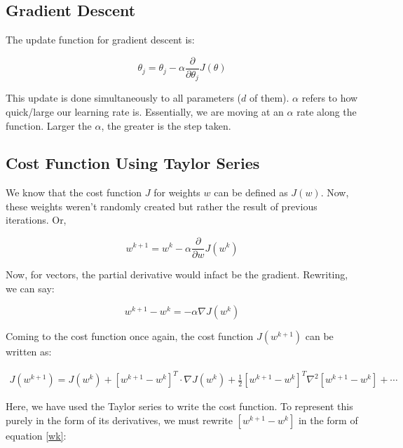 \subsection{Gradient Descent}

The update function for gradient descent is:

\begin{equation}
    \theta_j = \theta_j - \alpha \frac{\partial}{\partial\theta_j} J(\theta)
\end{equation}

This update is done simultaneously to all parameters ($d$ of them). $\alpha$ refers to how quick/large our learning rate is. Essentially, we are moving at an $\alpha$ rate along the function. Larger the $\alpha$, the greater is the step taken.

\subsection{Cost Function Using Taylor Series}

We know that the cost function $J$ for weights $w$ can be defined as $J(w)$. Now, these weights weren't randomly created but rather the result of previous iterations. Or, 

\begin{equation*}
    w^{k+1} = w^k - \alpha\frac{\partial}{\partial w}J(w^k)
\end{equation*}

Now, for vectors, the partial derivative would infact be the gradient. Rewriting, we can say:

\begin{equation}
     w^{k+1} - w^k = -\alpha \nabla J(w^k)
\label{wk}
\end{equation}

Coming to the cost function once again, the cost function $J(w^{k+1})$ can be written as:

\begin{equation}
\begin{split}
    J(w^{k+1}) = J(w^k) + [w^{k+1} - w^k]^T\cdot \nabla J(w^k) + \frac{1}{2}[w^{k+1} - w^k]^T\nabla^2[w^{k+1} - w^k] + \cdots
\end{split}
\label{cost-fn-2}
\end{equation}

Here, we have used the Taylor series to write the cost function. To represent this purely in the form of its derivatives, we must rewrite $[w^{k+1} - w^k]$ in the form of equation \ref{wk}:

